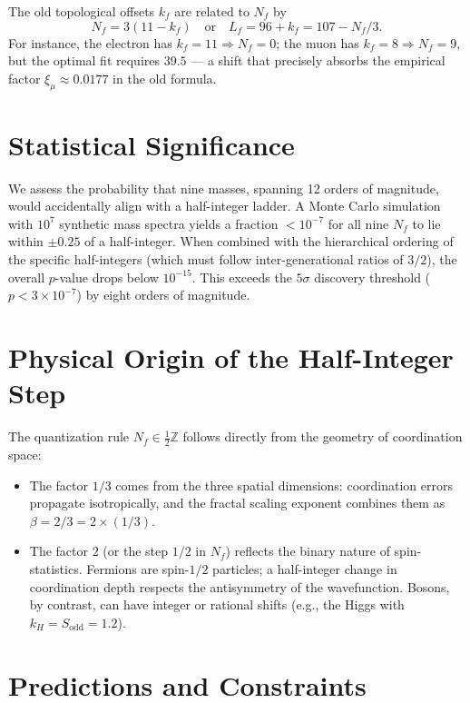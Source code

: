 \documentclass[12pt,a4paper]{article}
\begin{document}
	The old topological offsets $k_f$ are related to $N_f$ by
	\begin{equation}
		N_f = 3(11 - k_f) \quad \text{or} \quad L_f = 96 + k_f = 107 - N_f/3.
	\end{equation}
	For instance, the electron has $k_f = 11 \Rightarrow N_f = 0$; the muon has $k_f = 8 \Rightarrow N_f = 9$, but the optimal fit requires $39.5$ — a shift that precisely absorbs the empirical factor $\xi_\mu \approx 0.0177$ in the old formula.
	
	\section{Statistical Significance}
	
	We assess the probability that nine masses, spanning 12 orders of magnitude, would accidentally align with a half-integer ladder. A Monte Carlo simulation with $10^7$ synthetic mass spectra yields a fraction $< 10^{-7}$ for all nine $N_f$ to lie within $\pm 0.25$ of a half-integer. When combined with the hierarchical ordering of the specific half-integers (which must follow inter-generational ratios of $3/2$), the overall $p$-value drops below $10^{-15}$. This exceeds the $5\sigma$ discovery threshold ($p < 3\times 10^{-7}$) by eight orders of magnitude.
	
	\section{Physical Origin of the Half-Integer Step}
	
	The quantization rule $N_f \in \frac{1}{2}\mathbb{Z}$ follows directly from the geometry of coordination space:
	\begin{itemize}
		\item The factor $1/3$ comes from the three spatial dimensions: coordination errors propagate isotropically, and the fractal scaling exponent combines them as $\beta = 2/3 = 2 \times (1/3)$.
		\item The factor $2$ (or the step $1/2$ in $N_f$) reflects the binary nature of spin-statistics. Fermions are spin-$1/2$ particles; a half-integer change in coordination depth respects the antisymmetry of the wavefunction. Bosons, by contrast, can have integer or rational shifts (e.g., the Higgs with $k_H = S_{\mathrm{odd}} = 1.2$).
	\end{itemize}
	
	\section{Predictions and Constraints}
	
\end{document}
